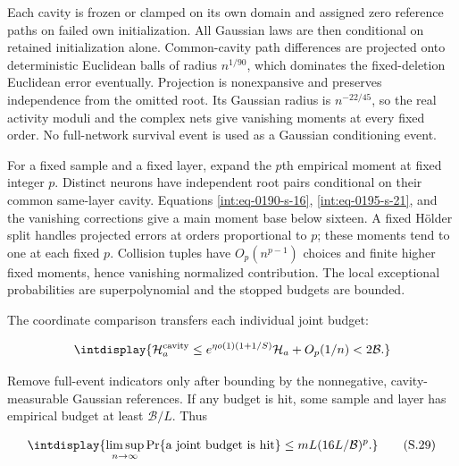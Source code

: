 
Each cavity is frozen or clamped on its own domain and assigned zero reference paths on failed own initialization. All Gaussian laws are then conditional on retained initialization alone. Common-cavity path differences are projected onto deterministic Euclidean balls of radius \(n^{1/90}\), which dominates the fixed-deletion Euclidean error eventually. Projection is nonexpansive and preserves independence from the omitted root. Its Gaussian radius is \(n^{-22/45}\), so the real activity moduli and the complex nets give vanishing moments at every fixed order. No full-network survival event is used as a Gaussian conditioning event.



For a fixed sample and a fixed layer, expand the \(p\)th empirical moment at fixed integer \(p\). Distinct neurons have independent root pairs conditional on their common same-layer cavity. Equations \eqref{int:eq-0190-s-16}, \eqref{int:eq-0195-s-21}, and the vanishing corrections give a main moment base below sixteen. A fixed Hölder split handles projected errors at orders proportional to \(p\); these moments tend to one at each fixed \(p\). Collision tuples have \(O_p(n^{p-1})\) choices and finite higher fixed moments, hence vanishing normalized contribution. The local exceptional probabilities are superpolynomial and the stopped budgets are bounded.



The coordinate comparison transfers each individual joint budget:


\begingroup\renewcommand{\theHequation}{intdisplay.414}
\begin{equation*}
\intdisplay{
\mathcal H_a^{\rm cavity}\le
 e^{\eta o(1)(1+1/S)}\mathcal H_a+O_p(1/n)<2\mathcal B.
}
\end{equation*}
\endgroup


Remove full-event indicators only after bounding by the nonnegative, cavity-measurable Gaussian references. If any budget is hit, some sample and layer has empirical budget at least \(\mathcal B/L\). Thus


\begingroup\renewcommand{\theHequation}{intdisplay.415}
\begin{equation}
\intdisplay{
\limsup_{n\to\infty}\Pr\{\hbox{a joint budget is hit}\}
\le mL(16L/\mathcal B)^p.
}
\tag{S.29}
\label{int:eq-0203-s-29}
\end{equation}
\endgroup

